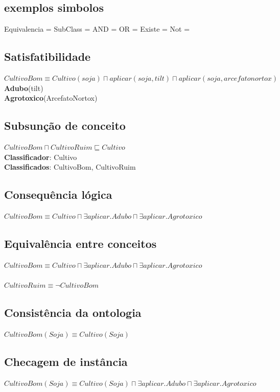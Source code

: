 \documentclass{article}
\begin{document}
    
\subsection{exemplos simbolos}    
Equivalencia = \equiv
SubClass = \sqsubseteq
AND = \sqcap
OR = \sqcup
Existe = \exists
Not = \neg

\subsection{Satisfatibilidade}
$CultivoBom \equiv Cultivo(soja) \sqcap aplicar(soja, tilt) \sqcap aplicar(soja, arcefatonortox)$ \\
\newline
\textbf{Adubo}(tilt) \\
\textbf{Agrotoxico}(ArcefatoNortox)

\subsection{Subsunção de conceito}
$CultivoBom \sqcap CultivoRuim \sqsubseteq Cultivo $ \\
\newline
\textbf{Classificador}: Cultivo \\
\textbf{Classificados}: CultivoBom, CultivoRuim

\subsection{Consequência lógica}
$CultivoBom \equiv Cultivo \sqcap \exists aplicar.Adubo \sqcap \exists aplicar.Agrotoxico$

\subsection{Equivalência entre conceitos}
$CultivoBom \equiv Cultivo \sqcap \exists aplicar.Adubo \sqcap \exists aplicar.Agrotoxico$ \\ \\
$CultivoRuim \equiv \neg CultivoBom$

\subsection{Consistência da ontologia}
$CultivoBom(Soja) \equiv Cultivo(Soja)$

\subsection{Checagem de instância}
$CultivoBom(Soja) \equiv Cultivo(Soja) \sqcap \exists aplicar.Adubo \sqcap \exists aplicar.Agrotoxico$
\end{document}
